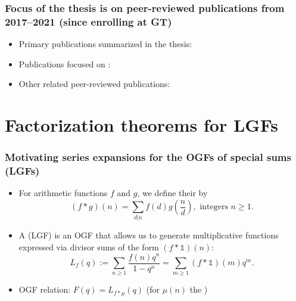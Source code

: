 \begin{frame}
\frametitle{Focus of the thesis is on peer-reviewed publications from 2017--2021 (since enrolling at GT)}
\begin{itemize} 

\item Primary publications summarized in the thesis: 
      \cite{AA,MDS-COMBRESTRDIVSUMS-INTEGERS,MDS-MERCA-AMM,MERCA-SCHMIDT-LSFACTTHM,MERCA-SCHMIDT-PN,MERCA-SCHMIDT-RAMJ,MOUSAVI-SCHMIDT-2019}
\pause\item Publications focused on : 
      \cite{MDS-JNT-2017,MDS-RAMJ-CFRACS,MDS-JIS-V2-2017,MDS-INTEGERS-CFRACS-V1,MDS-INTEGERS-CFRACS-V2}
\pause\item Other related peer-reviewed publications: 
      \cite{MDS-GFSURVEY,MDS-OJAC-V1,MDS-OJAC-V2,MDS-SQUARE-SERIES-GFTRANS,SCHMIDT-SODFORMULAS,MDS-COMBRESTRDIVSUMS-INTEGERS} 

\end{itemize}

\end{frame}

\section{Factorization theorems for LGFs}

\begin{frame}
\frametitle{Motivating series expansions for the OGFs of special sums (LGFs)}
\begin{itemize} 

\item For arithmetic functions $f$ and $g$, we define their  by 
     \[
	     (f \ast g)(n) = \sum_{d|n} f(d) g\left(\frac{n}{d}\right), \text{ integers } n \geq 1.
     \]
\pause\item A  (LGF) is an OGF that allows us to generate multiplicative functions 
      expressed via divisor sums of the form $(f \ast \mathds{1})(n)$:
      \[
      L_f(q) := \sum_{n \geq 1} \frac{f(n) q^n}{1-q^n} = \sum_{m \geq 1} (f \ast \mathds{1})(m) q^m.
      \]
\pause\item OGF relation: $F(q) = L_{f \ast \mu}(q)$ (for $\mu(n)$ the ) 

\end{itemize}

\end{frame}

